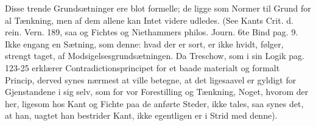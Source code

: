 \documentclass[12pt]{book}
\def\textit#1{#1}%
\def\emph#1{#1}%
\newcommand{\opage}[1]{\marginnote{\footnotesize\textit{[#1]}}}
\begin{document}
Disse trende Grundsætninger ere blot formelle; de ligge som \emph{Normer} til
Grund for al Tænkning, men af dem allene kan Intet videre udledes. (See Kants
Crit. d. rein. Vern. 189,
\opage{318} saa og Fichtes og Niethammers philos. Journ. 6te Bind pag. 9. Ikke engang en
Sætning, som denne: hvad der er sort, er ikke hvidt, følger, strengt taget, af
Modsigelsesgrundsætningen. Da Treschow, som i sin Logik pag. 123-25 erklærer
Contradictionsprincipet for et baade materialt og formalt Princip, derved synes
nærmest at ville betegne, at det ligesaavel er gyldigt for Gjenstandene i sig
selv, som for vor Forestilling og Tænkning, Noget, hvorom der her, ligesom hos
Kant og Fichte paa de anførte Steder, ikke tales, saa synes det, at han, uagtet
han bestrider Kant, ikke egentligen er i Strid med denne).
\end{document}
